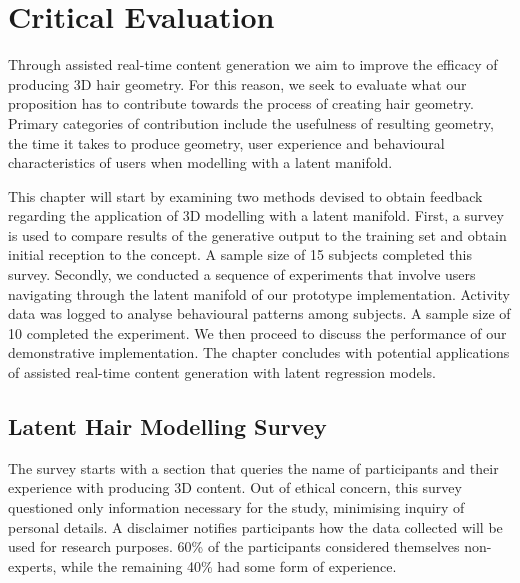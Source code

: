 \documentclass[ %
author={Dillon Keith Diep},
supervisor={Dr. Carl Henrik Ek},
degree={MEng},
title={ART-CG Hair:},
subtitle={Assisted Real-time Content Generation of Stylised Virtual Hair},
type={Research},
year={2017} ]{dissertation}
\begin{document}

\chapter{Critical Evaluation}
\label{chap:evaluation}
Through assisted real-time content generation we aim to improve the efficacy of producing 3D hair geometry. For this reason, we seek to evaluate what our proposition has to contribute towards the process of creating hair geometry. Primary categories of contribution include the usefulness of resulting geometry, the time it takes to produce geometry, user experience and behavioural characteristics of users when modelling with a latent manifold.

This chapter will start by examining two methods devised to obtain feedback regarding the application of 3D modelling with a latent manifold. First, a survey is used to compare results of the generative output to the training set and obtain initial reception to the concept. A sample size of 15 subjects completed this survey. Secondly, we conducted a sequence of experiments that involve users navigating through the latent manifold of our prototype implementation. Activity data was logged to analyse behavioural patterns among subjects. A sample size of 10 completed the experiment. We then proceed to discuss the performance of our demonstrative implementation. The chapter concludes with potential applications of assisted real-time content generation with latent regression models.

\section{Latent Hair Modelling Survey}
The survey starts with a section that queries the name of participants and their experience with producing 3D content. Out of ethical concern, this survey questioned only information necessary for the study, minimising inquiry of personal details. A disclaimer notifies participants how the data collected will be used for research purposes. 60\% of the participants considered themselves non-experts, while the remaining 40\% had some form of experience.
\end{document}
